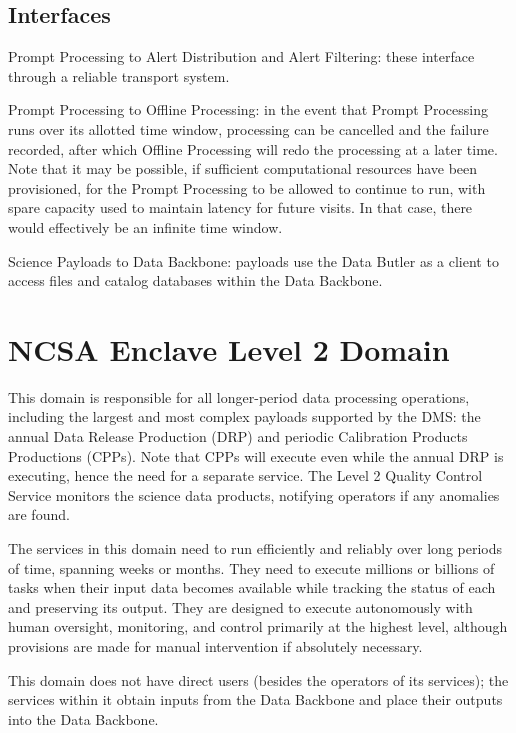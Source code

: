 \documentclass[DM,lsstdraft,toc]{lsstdoc}
\begin{document}
\subsection{Interfaces}\label{ncsa-l1-interfaces}

Prompt Processing to Alert Distribution and Alert Filtering: these
interface through a reliable transport system.

Prompt Processing to Offline Processing: in the event that Prompt
Processing runs over its allotted time window, processing can be
cancelled and the failure recorded, after which Offline Processing will
redo the processing at a later time. Note that it may be possible, if
sufficient computational resources have been provisioned, for the Prompt
Processing to be allowed to continue to run, with spare capacity used to
maintain latency for future visits. In that case, there would
effectively be an infinite time window.

Science Payloads to Data Backbone: payloads use the Data Butler as a
client to access files and catalog databases within the Data Backbone.

\section{NCSA Enclave Level 2 Domain}\label{ncsa-enclave-level-2-domain}

This domain is responsible for all longer-period data processing
operations, including the largest and most complex payloads supported by
the DMS: the annual Data Release Production (DRP) and periodic
Calibration Products Productions (CPPs). Note that CPPs will execute
even while the annual DRP is executing, hence the need for a separate
service. The Level 2 Quality Control Service monitors the science data
products, notifying operators if any anomalies are found.

The services in this domain need to run efficiently and reliably over
long periods of time, spanning weeks or months. They need to execute
millions or billions of tasks when their input data becomes available
while tracking the status of each and preserving its output. They are
designed to execute autonomously with human oversight, monitoring, and
control primarily at the highest level, although provisions are made for
manual intervention if absolutely necessary.

This domain does not have direct users (besides the operators of its
services); the services within it obtain inputs from the Data Backbone
and place their outputs into the Data Backbone.
\end{document}
